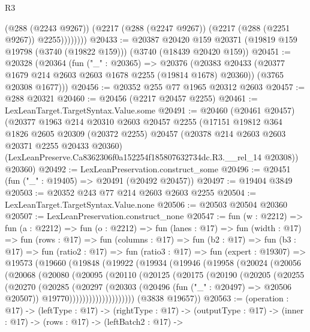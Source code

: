 \begin{lexlean}{R3}
\begin{coremodule}
                (@288 (@2243 @9267))
                (@2217 (@288 (@2247 @9267)) (@2217 (@288 (@2251 @9267)) @2255))))))))
@20433 := @20387
    @20420
    @159
    @20371
    (@19819 @159 @19798 (@3740 (@19822 @159)))
    (@3740 (@18439 @20420 @159))
@20451 := @20328
    (@20364
      (fun ("_" : @20365) =>
      @20376
        (@20383 @20433 (@20377 @1679 @214 @2603 @2603 @1678 @2255 (@19814 @1678) @20360))
        (@3765 @20308 @1677)))
@20456 := @20352 @255 @77 @1965 @20312 @2603
@20457 := @288 @20321
@20460 := @20456 (@2217 @20457 @2255)
@20461 := LexLeanTarget.TargetSyntax.Value.some
@20491 := @20460
    (@20461 @20457)
    (@20377
      @1963
      @214
      @20310
      @2603
      @20457
      @2255
      (@17151
        @19812
        @364
        @1826
        @2605
        @20309
        (@20372 @2255)
        @20457
        (@20378 @214 @2603 @2603 @20371 @2255 @20433 @20360)
        (LexLeanPreserve.Ca8362306f0a152254f185807632734dc.R3.__rel_14 @20308))
      @20360)
@20492 := LexLeanPreservation.construct_some
@20496 := @20451 (fun ("_" : @19405) => @20491 (@20492 @20457))
@20497 := @19404 @3849
@20503 := @20352 @243 @77 @214 @2603 @2603 @2255
@20504 := LexLeanTarget.TargetSyntax.Value.none
@20506 := @20503 @20504 @20360
@20507 := LexLeanPreservation.construct_none
@20547 := fun (w : @2212) =>
  fun (a : @2212) =>
  fun (o : @2212) =>
  fun (lanes : @17) =>
  fun (width : @17) =>
  fun (rows : @17) =>
  fun (columns : @17) =>
  fun (b2 : @17) =>
  fun (b3 : @17) =>
  fun (ratio2 : @17) =>
  fun (ratio3 : @17) =>
  fun (expert : @19307) =>
  @19573
    (@19660
      (@19848
        (@19922
          (@19934
            (@19946
              (@19958
                (@20024
                  (@20056
                    (@20068
                      (@20080
                        (@20095
                          (@20110
                            (@20125
                              (@20175
                                (@20190
                                  (@20205
                                    (@20255
                                      (@20270
                                        (@20285
                                          (@20297
                                            (@20303
                                              (@20496 (fun ("_" : @20497) => @20506 @20507))
                                              @19770))))))))))))))))))))
      (@3838 @19657))
@20563 := (operation : @17) ->
  (leftType : @17) ->
  (rightType : @17) ->
  (outputType : @17) ->
  (inner : @17) ->
  (rows : @17) ->
  (leftBatch2 : @17) ->

\end{coremodule}
\end{lexlean}
